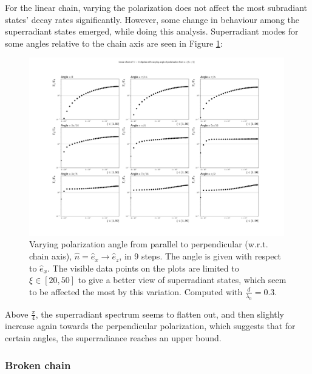 \documentclass{article}
\begin{document}
\noindent
For the linear chain, varying the polarization does not affect the most subradiant states' decay rates significantly. However, some change in behaviour among the superradiant states emerged, while doing this analysis. Superradiant modes for some angles relative to the chain axis are seen in Figure \ref{fig:linear_var_angle}:
\begin{figure}[H]
    \includegraphics[width=0.99\textwidth]{figs/case_linear_var_angle_0_pi05.png}
    \caption{Varying polarization angle from parallel to perpendicular (w.r.t. chain axis), $\hat{n} = \hat{e}_x \rightarrow \hat{e}_z$, in 9 steps. The angle is given with respect to $\hat{e}_x$. The visible data points on the plots are limited to $\xi \in [20, 50]$ to give a better view of superradiant states, which seem to be affected the most by this variation. Computed with $\frac{d}{\lambda_0} = 0.3$. }
    \label{fig:linear_var_angle}
\end{figure}
Above $\frac{\pi}{4}$, the superradiant spectrum seems to flatten out, and then slightly increase again towards the perpendicular polarization, which suggests that for certain angles, the superradiance reaches an upper bound. 

\subsubsection{Broken chain}\label{disc:linear_broken}
\end{document}
